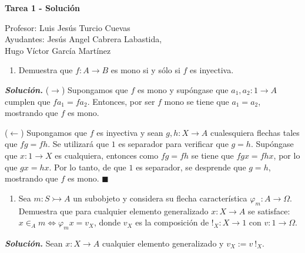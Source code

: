 \documentclass[12pt]{article}
\newcounter{A}
\newenvironment{ejercicio}{\begin{enumerate}[\bfseries \text{EJ \theA}.]\item}{\end{enumerate}\stepcounter{A}}
\newcommand{\QED}{\hfill\ensuremath{\blacksquare}}
\begin{document}
	\begin{center}
		\Huge \textbf{Tarea 1 - Solución}
	\end{center}
    \begin{flushright}
        \footnotesize Profesor: Luis Jesús Turcio Cuevas \\
		Ayudantes: Jesús Angel Cabrera Labastida, \\
		Hugo Víctor García Martínez
	\end{flushright}
    \normalsize

    \begin{ejercicio}
        Demuestra que \(f\colon A\to B\) es mono si y sólo si \(f\) es inyectiva.
    \end{ejercicio}

    \textbf{\textit{Solución.}} (\(\to\)) Supongamos que \(f\) es mono y supóngase que \(a_1,a_2 \colon 1 \to A\) cumplen que \(fa_1 = fa_2\). Entonces, por ser \(f\) mono se tiene que \(a_1 = a_2\), mostrando que \(f\) es mono.

    (\(\leftarrow\)) Supongamos que \(f\) es inyectiva y sean \(g,h \colon X \to A\) cualesquiera flechas tales que \(fg = fh\). Se utilizará que \(1\) es separador para verificar que \(g=h\). Supóngase que \(x \colon 1 \to X\) es cualquiera, entonces como \(fg=fh\) se tiene que \(fgx = fhx\), por lo que \(gx = hx\). Por lo tanto, de que \(1\) es separador, se desprende que \(g=h\), mostrando que \(f\) es mono. \QED
    
    \begin{ejercicio}
        Sea \(m\colon S\rightarrowtail A\) un subobjeto y considera su flecha característica \(\varphi_m\colon A\to \Omega\). Demuestra que para cualquier elemento generalizado \(x\colon X\to A\) se satisface: \( x\in_A m \iff \varphi_m x = v_X \), donde \(v_X\) es la composición de \(!_X\colon X\to 1\) con \(v\colon 1\to \Omega\).
    \end{ejercicio}

    \textbf{\textit{Solución.}} Sean \(x: X \to A\) cualquier elemento generalizado y $v_X:=v \: !_X$.
\end{document}
